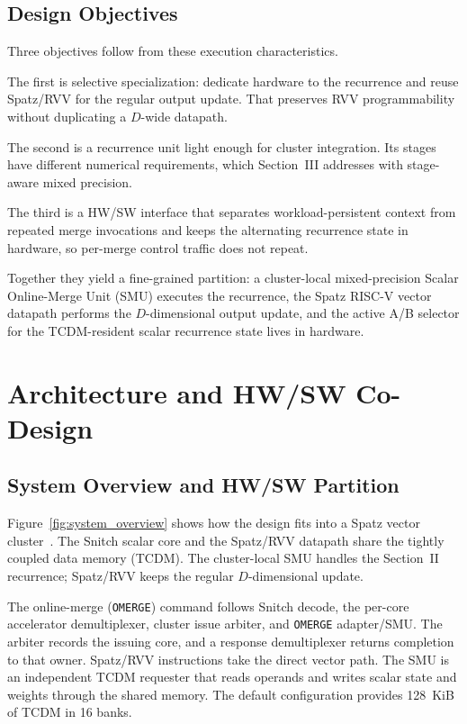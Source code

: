 \documentclass[journal]{IEEEtran}
\begin{document}
\subsection{Design Objectives}
Three objectives follow from these execution characteristics.

The first is selective specialization: dedicate hardware to the recurrence and
reuse Spatz/RVV for the regular output update. That preserves RVV
programmability without duplicating a $D$-wide datapath.

The second is a recurrence unit light enough for cluster integration. Its
stages have different numerical requirements, which Section~III addresses with
stage-aware mixed precision.

The third is a HW/SW interface that separates workload-persistent context from
repeated merge invocations and keeps the alternating recurrence state in
hardware, so per-merge control traffic does not repeat.

Together they yield a fine-grained partition: a cluster-local mixed-precision
Scalar Online-Merge Unit (SMU) executes the recurrence, the Spatz RISC-V vector
datapath performs the $D$-dimensional output update, and the active A/B
selector for the TCDM-resident scalar recurrence state lives in hardware.

\section{Architecture and HW/SW Co-Design}

\subsection{System Overview and HW/SW Partition}
Figure~\ref{fig:system_overview} shows how the design fits into a Spatz vector
cluster~\cite{Spatz2025}. The Snitch scalar core and the Spatz/RVV datapath
share the tightly coupled data memory (TCDM). The cluster-local SMU handles the
Section~II recurrence; Spatz/RVV keeps the regular $D$-dimensional update.

The online-merge (\texttt{OMERGE}) command follows Snitch decode, the per-core
accelerator demultiplexer, cluster issue arbiter, and \texttt{OMERGE} adapter/SMU. The
arbiter records the issuing core, and a response demultiplexer returns
completion to that owner.
Spatz/RVV instructions take the direct vector path. The SMU is an independent
TCDM requester that reads operands and writes scalar state and weights through
the shared memory. The default configuration provides 128~KiB of TCDM in 16
banks.
\end{document}
